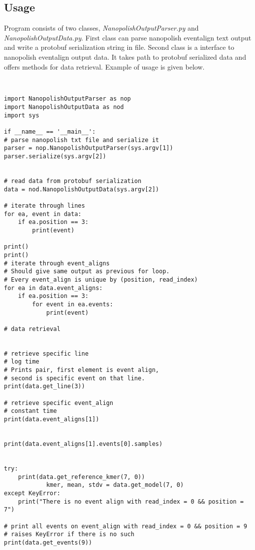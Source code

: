 \documentclass[]{article}
\begin{document}
\subsection{Usage}
Program consists of two classes, \textit{NanopolishOutputParser.py} and 
\textit{NanopolishOutputData.py}. First class can parse nanopolish 
eventalign text output and write a protobuf serialization string in file.
Second class is a interface to nanopolish eventalign output data. It takes 
path to protobuf serialized data and offers methods for data retrieval. 
Example of usage is given below. 


\begin{lstlisting}


import NanopolishOutputParser as nop
import NanopolishOutputData as nod
import sys

if __name__ == '__main__':
# parse nanopolish txt file and serialize it
parser = nop.NanopolishOutputParser(sys.argv[1])
parser.serialize(sys.argv[2])


# read data from protobuf serialization
data = nod.NanopolishOutputData(sys.argv[2])

# iterate through lines
for ea, event in data:
	if ea.position == 3:
		print(event)

print()
print()
# iterate through event_aligns
# Should give same output as previous for loop.
# Every event_align is unique by (position, read_index)
for ea in data.event_aligns:
	if ea.position == 3:
		for event in ea.events:
			print(event)

# data retrieval


# retrieve specific line
# log time
# Prints pair, first element is event align,
# second is specific event on that line.
print(data.get_line(3))

# retrieve specific event_align
# constant time
print(data.event_aligns[1])


print(data.event_aligns[1].events[0].samples)


try:
	print(data.get_reference_kmer(7, 0))
			kmer, mean, stdv = data.get_model(7, 0)
except KeyError:
	print("There is no event align with read_index = 0 && position = 7")

# print all events on event_align with read_index = 0 && position = 9
# raises KeyError if there is no such
print(data.get_events(9))
\end{lstlisting}
\newpage
\end{document}
